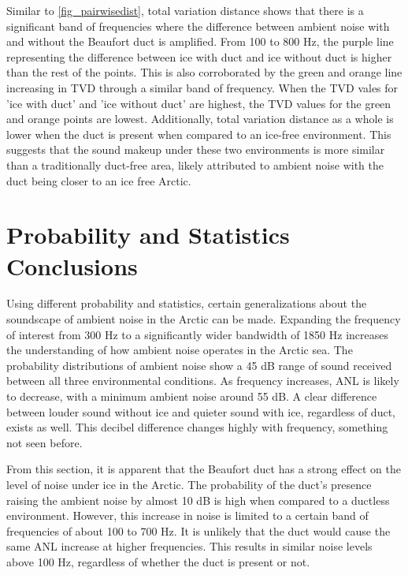 Similar to \autoref{fig_pairwisedist}, total variation distance shows that there is a significant band of frequencies where the difference between ambient noise with and without the Beaufort duct is amplified. From 100 to 800 Hz, the purple line representing the difference between ice with duct and ice without duct is higher than the rest of the points. This is also corroborated by the green and orange line increasing in TVD through a similar band of frequency. When the TVD vales for 'ice with duct' and 'ice without duct' are highest, the TVD values for the green and orange points are lowest. Additionally, total variation distance as a whole is lower when the duct is present when compared to an ice-free environment. This suggests that the sound makeup under these two environments is more similar than a traditionally duct-free area, likely attributed to ambient noise with the duct being closer to an ice free Arctic.




\section{Probability and Statistics Conclusions}
Using different probability and statistics, certain generalizations about the soundscape of ambient noise in the Arctic can be made. Expanding the frequency of interest from 300 Hz to a significantly wider bandwidth of 1850 Hz increases the understanding of how ambient noise operates in the Arctic sea. The probability distributions of ambient noise show a 45 dB range of sound received between all three environmental conditions. As frequency increases, ANL is likely to decrease, with a minimum ambient noise around 55 dB. A clear difference between louder sound without ice and quieter sound with ice, regardless of duct, exists as well. This decibel difference changes highly with frequency, something not seen before.

From this section, it is apparent that the Beaufort duct has a strong effect on the level of noise under ice in the Arctic. The probability of the duct's presence raising the ambient noise by almost 10 dB is high when compared to a ductless environment. However, this increase in noise is limited to a certain band of frequencies of about 100 to 700 Hz. It is unlikely that the duct would cause the same ANL increase at higher frequencies. This results in similar noise levels above 100 Hz, regardless of whether the duct is present or not.


